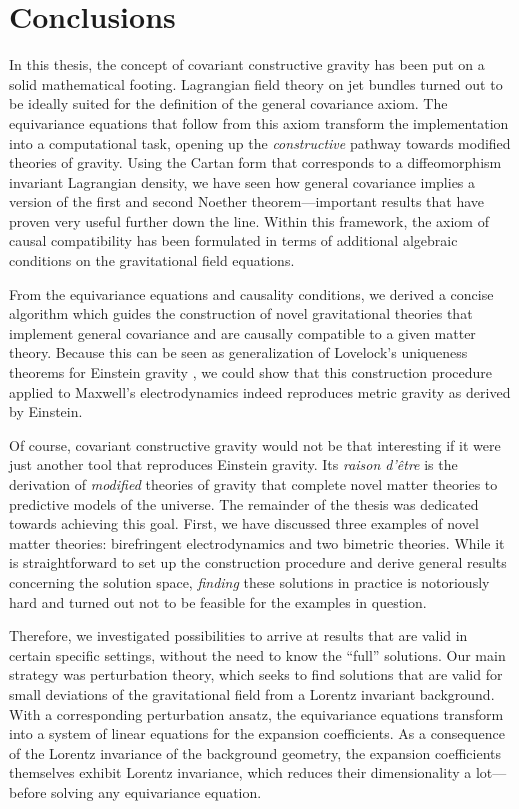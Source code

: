 \chapter{Conclusions}

In this thesis, the concept of covariant constructive gravity has been put on a solid mathematical footing. Lagrangian field theory on jet bundles turned out to be ideally suited for the definition of the general covariance axiom. The equivariance equations that follow from this axiom transform the implementation into a computational task, opening up the \emph{constructive} pathway towards modified theories of gravity. Using the Cartan form that corresponds to a diffeomorphism invariant Lagrangian density, we have seen how general covariance implies a version of the first and second Noether theorem---important results that have proven very useful further down the line. Within this framework, the axiom of causal compatibility has been formulated in terms of additional algebraic conditions on the gravitational field equations.

From the equivariance equations and causality conditions, we derived a concise algorithm which guides the construction of novel gravitational theories that implement general covariance and are causally compatible to a given matter theory. Because this can be seen as generalization of Lovelock's uniqueness theorems for Einstein gravity \cite{Lovelock_1969,Lovelock_1971,Lovelock_1972}, we could show that this construction procedure applied to Maxwell's electrodynamics indeed reproduces metric gravity as derived by Einstein.

Of course, covariant constructive gravity would not be that interesting if it were just another tool that reproduces Einstein gravity. Its \emph{raison d'\^etre} is the derivation of \emph{modified} theories of gravity that complete novel matter theories to predictive models of the universe. The remainder of the thesis was dedicated towards achieving this goal. First, we have discussed three examples of novel matter theories: birefringent electrodynamics and two bimetric theories. While it is straightforward to set up the construction procedure and derive general results concerning the solution space, \emph{finding} these solutions in practice is notoriously hard and turned out not to be feasible for the examples in question.

Therefore, we investigated possibilities to arrive at results that are valid in certain specific settings, without the need to know the ``full'' solutions. Our main strategy was perturbation theory, which seeks to find solutions that are valid for small deviations of the gravitational field from a Lorentz invariant background. With a corresponding perturbation ansatz, the equivariance equations transform into a system of linear equations for the expansion coefficients. As a consequence of the Lorentz invariance of the background geometry, the expansion coefficients themselves exhibit Lorentz invariance, which reduces their dimensionality a lot---before solving any equivariance equation.

